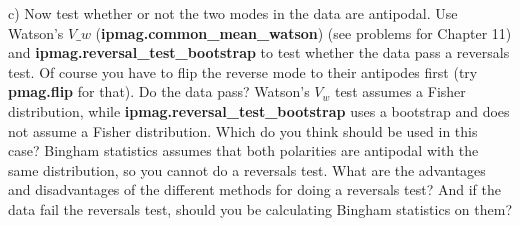 c) Now test whether or not  the two modes in the data are antipodal.    Use  Watson's $V\_w$ ({\bf ipmag.common\_mean\_watson}) (see problems for Chapter 11) and  {\bf ipmag.reversal\_test\_bootstrap}  to test whether the data pass a reversals test.   Of course you have to flip the reverse mode to their antipodes first (try {\bf pmag.flip} for that).   Do the data pass?  
Watson's $V_w$ test assumes a Fisher distribution, while  {\bf ipmag.reversal\_test\_bootstrap}  uses a bootstrap and does not assume a Fisher distribution.   Which do you think should be used in this case?    Bingham statistics assumes that both polarities are antipodal with the same distribution, so you cannot do a reversals test.   What are the advantages and disadvantages of the different methods for doing a reversals test?    And if the data fail the reversals test, should you be calculating Bingham statistics on them?  
%
%
%
%
